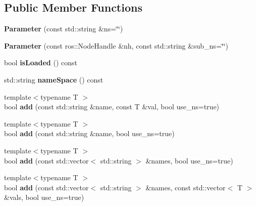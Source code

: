 \subsection*{Public Member Functions}
\begin{DoxyCompactItemize}
\item 
{\bfseries Parameter} (const std\+::string \&ns=\char`\"{}\char`\"{})\hypertarget{classow_1_1Parameter_a3e73f3b00d71d73af43a86ba889cbf84}{}\label{classow_1_1Parameter_a3e73f3b00d71d73af43a86ba889cbf84}

\item 
{\bfseries Parameter} (const ros\+::\+Node\+Handle \&nh, const std\+::string \&sub\+\_\+ns=\char`\"{}\char`\"{})\hypertarget{classow_1_1Parameter_a2a684436cb6f2cb11459f9b315f76871}{}\label{classow_1_1Parameter_a2a684436cb6f2cb11459f9b315f76871}

\item 
bool {\bfseries is\+Loaded} () const \hypertarget{classow_1_1Parameter_a5964cc0f34e60f5cb23141ec4b959467}{}\label{classow_1_1Parameter_a5964cc0f34e60f5cb23141ec4b959467}

\item 
std\+::string {\bfseries name\+Space} () const \hypertarget{classow_1_1Parameter_a98aca39fc03fdd14b22a0b5abb8122d0}{}\label{classow_1_1Parameter_a98aca39fc03fdd14b22a0b5abb8122d0}

\item 
{\footnotesize template$<$typename T $>$ }\\bool {\bfseries add} (const std\+::string \&name, const T \&val, bool use\+\_\+ns=true)\hypertarget{classow_1_1Parameter_a663890f54b348d3e342f98b85751f19c}{}\label{classow_1_1Parameter_a663890f54b348d3e342f98b85751f19c}

\item 
{\footnotesize template$<$typename T $>$ }\\bool {\bfseries add} (const std\+::string \&name, bool use\+\_\+ns=true)\hypertarget{classow_1_1Parameter_aa8681811ee0cd772dfd4bc2e21b885eb}{}\label{classow_1_1Parameter_aa8681811ee0cd772dfd4bc2e21b885eb}

\item 
{\footnotesize template$<$typename T $>$ }\\bool {\bfseries add} (const std\+::vector$<$ std\+::string $>$ \&names, bool use\+\_\+ns=true)\hypertarget{classow_1_1Parameter_a2c68bda7c4790465c3564b6237290a8c}{}\label{classow_1_1Parameter_a2c68bda7c4790465c3564b6237290a8c}

\item 
{\footnotesize template$<$typename T $>$ }\\bool {\bfseries add} (const std\+::vector$<$ std\+::string $>$ \&names, const std\+::vector$<$ T $>$ \&vals, bool use\+\_\+ns=true)\hypertarget{classow_1_1Parameter_af1b7373eeefec07d780616d335da3250}{}\label{classow_1_1Parameter_af1b7373eeefec07d780616d335da3250}


\end{DoxyCompactItemize}
